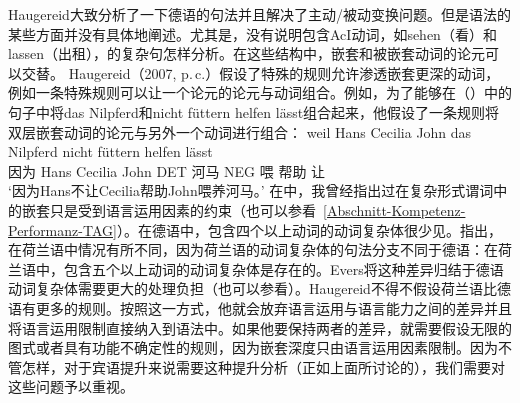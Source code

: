 \begin{exe}
\begin{xlist}[iv.]
\begin{exe}
\begin{xlist}[iv.]
Haugereid大致分析了一下德语的句法并且解决了主动/被动变换问题。但是语法的某些方面并没有具体地阐述。尤其是，没有说明包含AcI动词，如sehen（看）和lassen（出租），的复杂句怎样分析。在这些结构中，嵌套和被嵌套动词的论元可以交替。 Haugereid（2007, p.\,c.）假设了特殊的规则允许渗透嵌套更深的动词，例如一条特殊规则可以让一个论元的论元与动词组合。例如，为了能够在（）中的句子中将das Nilpferd和nicht füttern helfen lässt组合起来，他假设了一条规则将双层嵌套动词的论元与另外一个动词进行组合：
\ea
\label{ex-nilpferd-fuettern-helfen-laesst}
\gll weil    Hans Cecilia John das Nilpferd nicht füttern helfen lässt\\
     因为 Hans Cecilia John DET 河马 NEG 喂 帮助 让\\
\glt `因为Hans不让Cecilia帮助John喂养河马。'
\z
在\citet[]{Mueller2004b}中，我曾经指出过在复杂形式谓词中的嵌套只是受到语言运用因素的约束（也可以参看~\ref{Abschnitt-Kompetenz-Performanz-TAG}）。在德语中，包含四个以上动词的动词复杂体很少见。\citet[--59]{Evers75a}指出，在荷兰语中情况有所不同，因为荷兰语的动词复杂体的句法分支不同于德语：在荷兰语中，包含五个以上动词的动词复杂体是存在的。Evers将这种差异归结于德语动词复杂体需要更大的处理负担（也可以参看\citealp[\S~3.7]{Gibson98a}）。Haugereid不得不假设荷兰语比德语有更多的规则。按照这一方式，他就会放弃语言运用与语言能力之间的差异并且将语言运用限制直接纳入到语法中。如果他要保持两者的差异，就需要假设无限的图式或者具有功能不确定性的规则，因为嵌套深度只由语言运用因素限制\citep{HN94a}。因为不管怎样，对于宾语提升来说需要这种提升分析（正如上面所讨论的），我们需要对这些问题予以重视。

\end{xlist}
\end{exe}
\end{xlist}
\end{exe}
